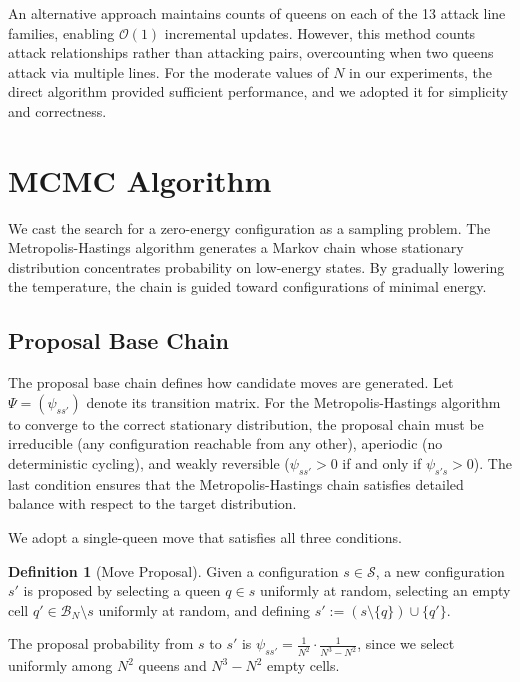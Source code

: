 \documentclass[10pt,twocolumn,a4paper]{article}
\newcommand{\statespace}{\mathcal{S}}
\newcommand{\board}{\mathcal{B}}
\newcommand{\bigO}{\mathcal{O}}
\theoremstyle{definition}
\newtheorem{definition}{Definition}[section]
\theoremstyle{remark}
\begin{document}
An alternative approach maintains counts of queens on each of the 13 attack line families, enabling $\bigO(1)$ incremental updates. However, this method counts attack relationships rather than attacking pairs, overcounting when two queens attack via multiple lines. For the moderate values of $N$ in our experiments, the direct algorithm provided sufficient performance, and we adopted it for simplicity and correctness.

\section{MCMC Algorithm}\label{sec:mcmc}
We cast the search for a zero-energy configuration as a sampling problem. The Metropolis-Hastings algorithm generates a Markov chain whose stationary distribution concentrates probability on low-energy states. By gradually lowering the temperature, the chain is guided toward configurations of minimal energy.

\subsection{Proposal Base Chain}
The proposal base chain defines how candidate moves are generated. Let $\Psi=(\psi_{ss'})$ denote its transition matrix. For the Metropolis-Hastings algorithm to converge to the correct stationary distribution, the proposal chain must be irreducible (any configuration reachable from any other), aperiodic (no deterministic cycling), and weakly reversible ($\psi_{ss'}>0$ if and only if $\psi_{s's}>0$). The last condition ensures that the Metropolis-Hastings chain satisfies detailed balance with respect to the target distribution.

We adopt a single-queen move that satisfies all three conditions.

\begin{definition}[Move Proposal]
Given a configuration $s\in\statespace$, a new configuration $s'$ is proposed by selecting a queen $q\in s$ uniformly at random, selecting an empty cell $q'\in\board_N\setminus s$ uniformly at random, and defining $s':=(s\setminus\{q\})\cup\{q'\}$.
\end{definition}
The proposal probability from $s$ to $s'$ is $\psi_{ss'}=\frac{1}{N^2}\cdot\frac{1}{N^3-N^2}$, since we select uniformly among $N^2$ queens and $N^3-N^2$ empty cells.
\end{document}
